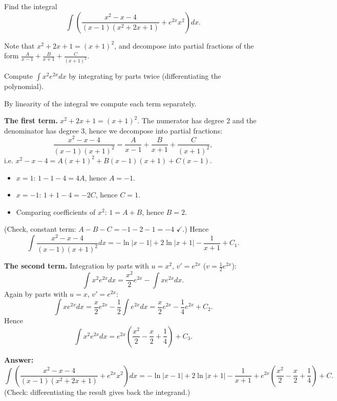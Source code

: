 
\begin{question}
Find the integral
\[ \int\left(\frac{x^2-x-4}{(x-1)(x^2+2x+1)}+e^{2x}x^2\right)dx. \]
\end{question}

\begin{hint}
Note that $x^2+2x+1=(x+1)^2$, and decompose into partial fractions of the form $\frac{A}{x-1}+\frac{B}{x+1}+\frac{C}{(x+1)^2}$.
\end{hint}

\begin{hint}
Compute $\int x^2e^{2x}dx$ by integrating by parts twice (differentiating the polynomial).
\end{hint}

\begin{solution}
By linearity of the integral we compute each term separately.

\textbf{The first term.} $x^2+2x+1=(x+1)^2$. The numerator has degree 2 and the denominator has degree 3, hence we decompose into partial fractions:
\[ \frac{x^2-x-4}{(x-1)(x+1)^2} = \frac{A}{x-1}+\frac{B}{x+1}+\frac{C}{(x+1)^2}, \]
i.e. $x^2-x-4 = A(x+1)^2+B(x-1)(x+1)+C(x-1)$.
\begin{itemize}
  \item $x=1$: $1-1-4=4A$, hence $A=-1$.
  \item $x=-1$: $1+1-4=-2C$, hence $C=1$.
  \item Comparing coefficients of $x^2$: $1=A+B$, hence $B=2$.
\end{itemize}
(Check, constant term: $A-B-C=-1-2-1=-4$ $\checkmark$.) Hence
\[ \int\frac{x^2-x-4}{(x-1)(x+1)^2}dx = -\ln|x-1| + 2\ln|x+1| - \frac{1}{x+1}+C_1. \]

\textbf{The second term.} Integration by parts with $u=x^2$, $v'=e^{2x}$ ($v=\frac12e^{2x}$):
\[ \int x^2e^{2x}dx = \frac{x^2}{2}e^{2x} - \int xe^{2x}dx. \]
Again by parts with $u=x$, $v'=e^{2x}$:
\[ \int xe^{2x}dx = \frac{x}{2}e^{2x}-\frac12\int e^{2x}dx = \frac x2e^{2x}-\frac14e^{2x}+C_2. \]
Hence
\[ \int x^2e^{2x}dx = e^{2x}\left(\frac{x^2}{2}-\frac{x}{2}+\frac14\right)+C_3. \]

\textbf{Answer:}
\[ \int\left(\frac{x^2-x-4}{(x-1)(x^2+2x+1)}+e^{2x}x^2\right)dx = -\ln|x-1|+2\ln|x+1|-\frac{1}{x+1}+e^{2x}\left(\frac{x^2}{2}-\frac{x}{2}+\frac14\right)+C. \]
(Check: differentiating the result gives back the integrand.)
\end{solution}

